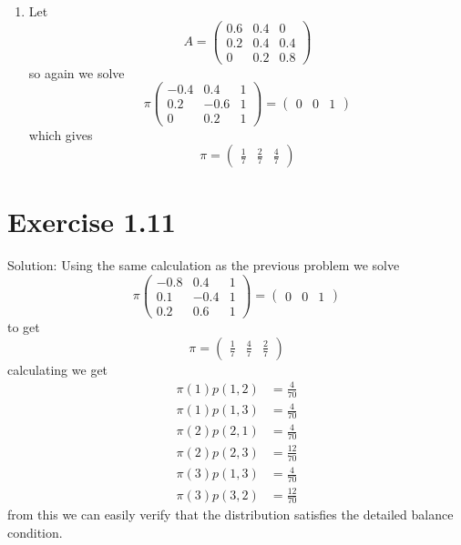 \documentclass[11pt]{article}
\newcommand{\solution}[1]{{{\textcolor{header}{Solution:} \textcolor{solution}{#1}}}}
\begin{document}
{\begin{enumerate}
\[            \] 
            giving
            \[
                \pi = \begin{pmatrix} \frac{1}{3} & \frac{1}{3} & \frac{1}{3} \end{pmatrix} 
            \] 
        \item 
            Let
            \[
                A = \begin{pmatrix} 0.6 & 0.4 & 0 \\
                    0.2 & 0.4 & 0.4 \\
                    0 & 0.2 & 0.8
                \end{pmatrix} 
            \] 
            so again we solve
            \[
                \pi \begin{pmatrix} -0.4 & 0.4 & 1 \\ 0.2 & -0.6 & 1 \\ 0 & 0.2 & 1 \end{pmatrix}  = \begin{pmatrix} 0 & 0 & 1 \end{pmatrix} 
            \] 
            which gives
            \[
                \pi = \begin{pmatrix} \frac{1}{7} & \frac{2}{7} & \frac{4}{7} \end{pmatrix} 
            \] 
    \end{enumerate}
}

\section{Exercise 1.11}
\solution{
    Using the same calculation as the previous problem we solve
    \[
        \pi \begin{pmatrix} -0.8 & 0.4 & 1 \\ 0.1 & -0.4 & 1 \\ 0.2 & 0.6 & 1 \end{pmatrix}  = \begin{pmatrix} 0 & 0 & 1 \end{pmatrix} 
    \] 
    to get
    \[
        \pi = \begin{pmatrix} \frac{1}{7} & \frac{4}{7} & \frac{2}{7} \end{pmatrix} 
    \] 
    calculating we get
    \begin{align*}
        \pi(1)p(1,2) &= \frac{4}{70}\\
        \pi(1)p(1,3) &= \frac{4}{70}\\
        \pi(2)p(2,1) &= \frac{4}{70}\\
        \pi(2)p(2,3) &= \frac{12}{70}\\
        \pi(3)p(1,3) &= \frac{4}{70}\\
        \pi(3)p(3,2) &= \frac{12}{70}
    \end{align*}
    from this we can easily verify that the distribution satisfies the detailed balance condition.
}
\end{document}
